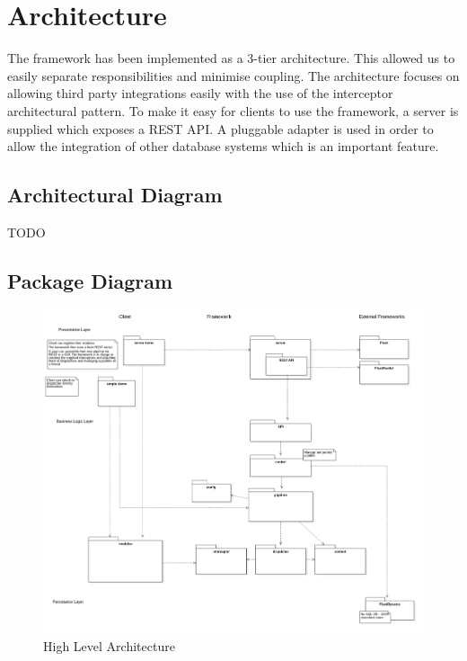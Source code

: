 \chapter{Architecture}

  The framework has been implemented as a 3-tier architecture. This allowed us to easily
  separate responsibilities and minimise coupling. The architecture focuses on allowing
  third party integrations easily with the use of the interceptor architectural pattern.
  To make it easy for clients to use the framework, a server is supplied which exposes
  a REST API. A pluggable adapter is used in order to allow the integration of other
  database systems which is an important feature.

  \section{Architectural Diagram}
  TODO

  \section{Package Diagram}
    \begin{figure}[H]
        \includegraphics[width = 1.2\linewidth]{diagrams/architecture.png}
        \caption{High Level Architecture}
        \label{fig:high_level_architecture}
      \end{figure}


